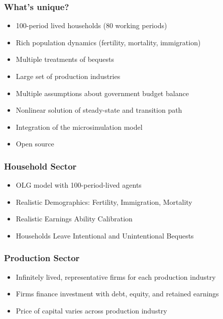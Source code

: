 \documentclass{beamer}
\begin{document}
  \begin{frame}
    \frametitle{What's unique?}
    \begin{itemize}
      \item 100-period lived households (80 working periods)
      \vspace{2mm}
      \item Rich population dynamics (fertility, mortality, immigration)
      \vspace{2mm}
      \item Multiple treatments of bequests
      \vspace{2mm}
      \item Large set of production industries
      \vspace{2mm}
      \item Multiple assumptions about government budget balance
      \vspace{2mm}
      \item Nonlinear solution of steady-state and transition path
      \vspace{2mm}
      \item Integration of the microsimulation model
      \vspace{2mm}
      \item Open source
    \end{itemize}
  \end{frame}

    \begin{frame}
    \frametitle{Household Sector}
    \begin{itemize}
      \item OLG model with 100-period-lived agents
      \item Realistic Demographics: Fertility, Immigration, Mortality
      \item Realistic Earnings Ability Calibration
      \item Households Leave Intentional and Unintentional Bequests
    \end{itemize}
  \end{frame}


      \begin{frame}
    \frametitle{Production Sector}
    \begin{itemize}
      \item Infinitely lived, representative firms for each production industry
      \item Firms finance investment with debt, equity, and retained earnings
      \item Price of capital varies across production industry
    \end{itemize}
  \end{frame}
\end{document}
